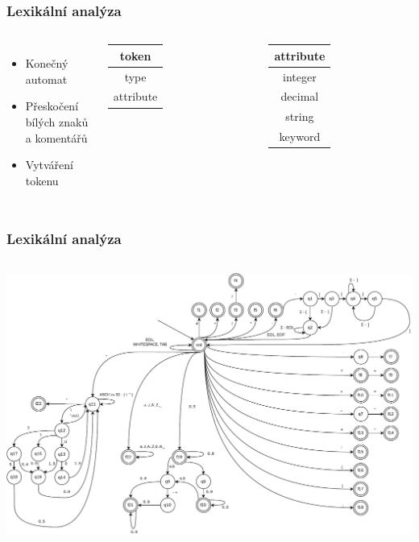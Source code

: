 \begin{frame}
  \frametitle{Lexikální analýza}
  \begin{columns}
  \begin{itemize}
      \item Konečný automat
      \item Přeskočení bílých znaků a komentářů
      \item Vytváření tokenu
  \end{itemize}
  \begin{tabular}{ ||c|| } 
      \hline
     token \\ [0.5ex] 
     \hline\hline
     type \\ 
     attribute \\
     \hline
  \end{tabular}\enspace\enspace
  \begin{tabular}{ ||c|| } 
      \hline
     attribute \\ [0.5ex] 
     \hline\hline
     integer \\ 
     decimal \\
     string \\
     keyword \\
     \hline
  \end{tabular}
  
  \end{columns}
\end{frame}



\begin{frame}
  \frametitle{Lexikální analýza}
  \begin{columns}
    \includegraphics[width=\textwidth]{img/IFJ2021_FSM_final.pdf}
  \end{columns}
\end{frame}

